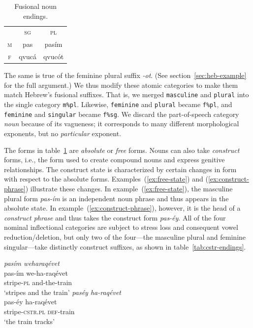 {\begin{description}
   \begin{table}[t]
      \small
      \centering
       \setlength{\extrarowheight}{6pt}
      \begin{tabular}{ccc} 
 \toprule
 &  \textsc{sg} & \textsc{pl}\\
\cmidrule{2-3} 
\textsc{m} & pas & pas\'{i}m \\
\textsc{f}  &	qvuc\'{a}	& qvuc\'{o}t \\	
    \bottomrule
    \end{tabular}
    \label{tab:abs-only}
    \caption{Fusional noun endings.}
    \end{table}
 The same is true 
of the feminine plural suffix \textit{-ot}. (See section~\ref{sec:heb-example} for the full argument.)
We thus modify these atomic categories to make them match 
Hebrew's fusional suffixes. That is, we merged \texttt{masculine} 
and \texttt{plural} into the single category \texttt{m\%pl}. Likewise, 
\texttt{feminine} and \texttt{plural} became \texttt{f\%pl}, and \texttt{feminine} 
and \texttt{singular} became \texttt{f\%sg}.
We discard the part-of-speech category \emph{noun} because of its vagueness; it corresponds to many different morphological exponents, but no \emph{particular} exponent.

\item[Construct State.]
The forms in table~\ref{tab:abs-only} are \emph{absolute} or \emph{free} forms. 
Nouns can also take \emph{construct} forms, i.e., the form used to create compound 
nouns and express genitive relationships. The construct state is characterized by 
certain changes in form with respect to the absolute forms. 
Examples~(\ref{ex:free-state}) and (\ref{ex:construct-phrase})
illustrate these changes.
In example~(\ref{ex:free-state}), the masculine plural form \textit{pas-\'{i}m} is an independent noun phrase 
and thus appears in the absolute state. In example~(\ref{ex:construct-phrase}), however, it is the head 
of a \emph{construct phrase} and thus takes the construct form \emph{pas-\'{e}y}. 
All of the four nominal inflectional categories are subject to stress loss and consequent 
vowel reduction/deletion, but only two of the four---the masculine plural and 
feminine singular---take distinctly construct suffixes, as shown in table~\ref{tab:cstr-endings}. 

\begin{exe}
\ex \textit{pas\'{i}m \quad weharaq\'{e}vet} \\ \label{ex:free-state}
pas-\'{i}m \quad we-ha-raq\'{e}vet \\
stripe-\textsc{pl} \quad and-the-train \\
`stripes and the train'
\ex \textit{pas\'{e}y \quad ha-raq\'{e}vet} \\ \label{ex:construct-phrase}
pas-\'{e}y \quad ha-raq\'{e}vet \\
stripe-\textsc{cstr.pl} \quad \textsc{def}-train \\
`the train tracks'
\end{exe}


\end{description}}
